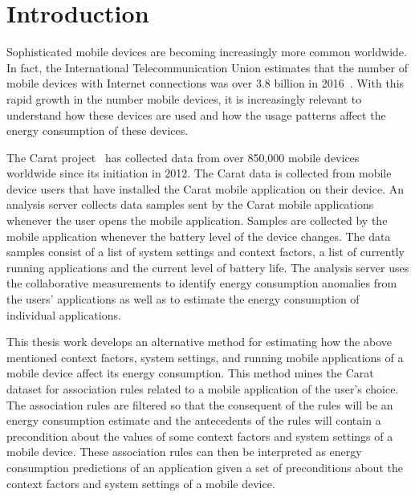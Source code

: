 \section{Introduction}


Sophisticated mobile devices are becoming increasingly more common worldwide. In fact, the International Telecommunication Union estimates that the number of mobile devices with Internet connections was over 3.8 billion in 2016~\cite{ITUstats}. With this rapid growth in the number mobile devices, it is increasingly relevant to understand how these devices are used and how the usage patterns affect the energy consumption of these devices.    

The Carat project~\cite{Oliner:2012:CED:2387858.2387864, Oliner:2013:CCE:2517351.2517354, 7840871, PELTONEN201671, 7146507} has collected data from over 850,000 mobile devices worldwide since its initiation in 2012. The Carat data is collected from mobile device users that have installed the Carat mobile application on their device. An analysis server collects data samples sent by the Carat mobile applications whenever the user opens the mobile application. Samples are collected by the mobile application whenever the battery level of the device changes. The data samples consist of a list of system settings and context factors, a list of currently running applications and the current level of battery life. The analysis server uses the collaborative measurements to identify energy consumption anomalies from the users' applications as well as to estimate the energy consumption of individual applications.

This thesis work develops an alternative method for estimating how the above mentioned context factors, system settings, and running mobile applications of a mobile device affect its energy consumption. This method mines the Carat dataset for association rules related to a mobile application of the user's choice. The association rules are filtered so that the consequent of the rules will be an energy consumption estimate and the antecedents of the rules will contain a precondition about the values of some context factors and system settings of a mobile device. These association rules can then be interpreted as energy consumption predictions of an application given a set of preconditions about the context factors and system settings of a mobile device.      

